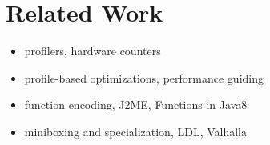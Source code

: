 \section{Related Work}
\label{sec:related}

\begin{itemize}
  \item profilers, hardware counters
  \item profile-based optimizations, performance guiding
  \item function encoding, J2ME, Functions in Java8
  \item miniboxing and specialization, LDL, Valhalla
\end{itemize}